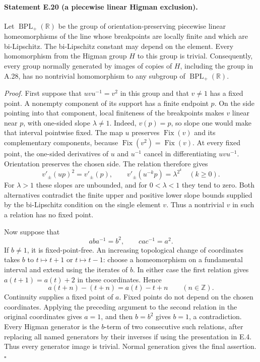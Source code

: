 \paragraph{Statement E.20 (a piecewise linear Higman exclusion).}
Let $\operatorname{BPL}_+(\mathbb R)$ be the group of
orientation-preserving piecewise linear homeomorphisms of the line
whose breakpoints are locally finite and which are bi-Lipschitz.
The bi-Lipschitz constant may depend on the element.
Every homomorphism from the Higman group $H$ to this group is
trivial. Consequently, every group normally generated by images
of copies of $H$, including the group in A.28, has no nontrivial homomorphism
to any subgroup of $\operatorname{BPL}_+(\mathbb R)$.

\emph{Proof.}
First suppose that $uvu^{-1}=v^2$ in this group and that $v\ne1$
has a fixed point. A nonempty component of its support has a finite
endpoint $p$. On the side pointing into that component, local
finiteness of the breakpoints makes $v$ linear near $p$, with
one-sided slope $\lambda\ne1$. Indeed, $v(p)=p$, so slope one
would make that interval pointwise fixed. The map $u$ preserves
$\operatorname{Fix}(v)$ and its complementary components, because
$\operatorname{Fix}(v^2)=\operatorname{Fix}(v)$.
At every fixed point, the one-sided derivatives of $u$ and $u^{-1}$
cancel in differentiating $uvu^{-1}$. Orientation preserves the
chosen side. The relation therefore gives
\[
 v'_{\pm}(up)^2=v'_{\pm}(p),\qquad
 v'_{\pm}(u^{-k}p)=\lambda^{2^k}\quad(k\ge0).
\]
For $\lambda>1$ these slopes are unbounded, and for $0<\lambda<1$
they tend to zero. Both alternatives contradict the finite upper
and positive lower slope bounds supplied by the bi-Lipschitz
condition on the single element $v$. Thus a nontrivial $v$ in such
a relation has no fixed point.

Now suppose that
\[
 aba^{-1}=b^2,\qquad cac^{-1}=a^2.
\]
If $b\ne1$, it is fixed-point-free. An increasing topological change
of coordinates takes $b$ to $t\mapsto t+1$ or $t\mapsto t-1$:
choose a homeomorphism on a fundamental interval and extend using
the iterates of $b$. In either case the first relation gives
$a(t+1)=a(t)+2$ in these coordinates. Hence
\[
 a(t+n)-(t+n)=a(t)-t+n\qquad(n\in\mathbb Z).
\]
Continuity supplies a fixed point of $a$. Fixed points do not depend
on the chosen coordinates. Applying the preceding argument to the
second relation in the original coordinates gives $a=1$, and then
$b=b^2$ gives $b=1$, a contradiction. Every Higman generator is the
$b$-term of two consecutive such relations, after replacing all
named generators by their inverses if using the presentation in
E.4. Thus every generator image is trivial. Normal generation gives
the final assertion. \hfill$\square$

